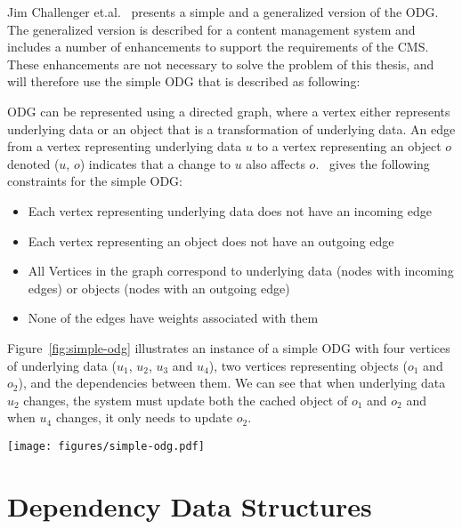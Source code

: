 Jim Challenger et.al.~\cite{paper:ibm-extended} presents a simple and a generalized version of the ODG. The generalized version is described for a content management system and includes a number of enhancements to support the requirements of the CMS. These enhancements are not necessary to solve the problem of this thesis, and will therefore use the simple ODG that is described as following:

ODG can be represented using a directed graph, where a vertex either represents underlying data or an object that is a transformation of underlying data. An edge from a vertex representing underlying data $u$ to a vertex representing an object $o$ denoted ($u$, $o$) indicates that a change to $u$ also affects $o$.~\cite{paper:ibm-extended} gives the following constraints for the simple ODG:

\begin{itemize}
  \item Each vertex representing underlying data does not have an incoming edge
  \item Each vertex representing an object does not have an outgoing edge
  \item All Vertices in the graph correspond to underlying data (nodes with incoming edges) or objects (nodes with an outgoing edge)
  \item None of the edges have weights associated with them
\end{itemize}

Figure~\ref{fig:simple-odg} illustrates an instance of a simple ODG with four vertices of underlying data ($u_1$, $u_2$, $u_3$ and $u_4$), two vertices representing objects ($o_1$ and $o_2$), and the dependencies between them. We can see that when underlying data $u_2$ changes, the system must update both the cached object of $o_1$ and $o_2$ and when $u_4$ changes, it only needs to update $o_2$.

\begin{figure*}[ht!]
  \centering
  \texttt{[image: figures/simple-odg.pdf]}
  \caption{An example instance of a simple ODG}
  \label{fig:simple-odg}
\end{figure*}


\section{Dependency Data Structures}
\label{sec:dependency-data-structure-for-cachable-functions}

